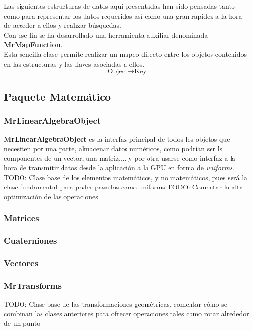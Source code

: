 Las siguientes estructuras de datos aquí presentadas han sido pensadas tanto como para representar los datos requeridos así como una gran rapidez a la hora de acceder a ellos y realizar búsquedas.\\
Con ese fin se ha desarrollado una herramienta auxiliar denominada \textbf{MrMapFunction}.\\
Esta sencilla clase permite realizar un mapeo directo entre los objetos contenidos en las estructuras y las llaves asociadas a ellos.
$$\text{Object}\mapsto \text{Key}$$

\subsection{Paquete Matemático}
\subsubsection{MrLinearAlgebraObject}
\textbf{MrLinearAlgebraObject} es la interfaz principal de todos los objetos que necesiten por una parte, almacenar datos numéricos, como podrían ser ls componentes de un vector, una matriz,... y por otra usarse como interfaz a la hora de transmitir datos desde la aplicación a la GPU en forma de \textit{uniforms}.
TODO: Clase base de los elementos matemáticos, y no matemáticos, pues será la clase fundamental para poder pasarlos como uniforms
TODO: Comentar la alta optimización de las operaciones
\subsubsection{Matrices}
\subsubsection{Cuaterniones}
\subsubsection{Vectores}
\subsubsection{MrTransforms}
TODO: Clase base de las transformaciones geométricas, comentar cómo se combinan las clases anteriores para ofrecer operaciones tales como rotar alrededor de un punto